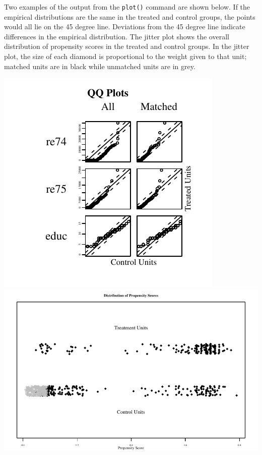 Two examples of the output from the {\tt plot()} command are shown
below.  If the empirical distributions are the same in the treated and
control groups, the points would all lie on the 45 degree line.
Deviations from the 45 degree line indicate differences in the
empirical distribution.  The jitter plot shows the overall
distribution of propensity scores in the treated and control groups.
In the jitter plot, the size of each diamond is proportional to the
weight given to that unit; matched units are in black while unmatched
units are in grey.

\hspace{-0.75in}\includegraphics{figs/qqplotnn1}
\includegraphics[scale=0.75]{figs/jitterplotnn}


